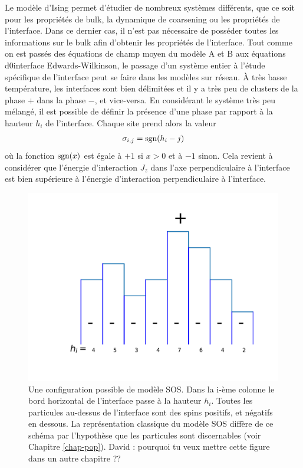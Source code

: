 Le modèle d'Ising permet d'étudier de nombreux systèmes différents, que ce soit pour les propriétés de bulk, la dynamique de coarsening ou les propriétés de l'interface. Dans ce dernier cas, il n'est pas nécessaire de posséder toutes les informations sur le bulk afin d'obtenir les propriétés de l'interface. 
Tout comme on est passés des équations de champ moyen du modèle A et B aux équations d0interface Edwards-Wilkinson, le passage d'un système entier à l'étude spécifique de l'interface peut se faire dans les modèles sur réseau.
À très basse température, les interfaces sont bien délimitées et il y a très peu de clusters de la phase $+$ dans la phase $-$, et vice-versa. En considérant le système très peu mélangé, il est possible de définir la présence d'une phase par rapport à la hauteur $h_i$ de l'interface. Chaque site prend alors la valeur
\begin{align*}
	\sigma_{i,j} = \operatorname{sgn}(h_i-j)
\end{align*}
où la fonction $\operatorname{sgn}(x)$ est égale à $+1$ si $x >0$ et à $-1$ sinon. Cela revient à considérer que l'énergie d'interaction $J_z$ dans l'axe perpendiculaire à l'interface est bien supérieure à l'énergie d'interaction perpendiculaire à l'interface.

\begin{figure}
	\centering
	\includegraphics[scale=1]{int-dyn/sos-indiscernable.pdf}
	\caption{Une configuration possible de modèle SOS. Dans la i-ème colonne le bord horizontal de l'interface passe à la hauteur $h_i$. Toutes les particules au-dessus de l'interface sont des spins positifs, et négatifs en dessous. La représentation classique du modèle SOS diffère de ce schéma par l'hypothèse que les particules sont discernables (voir Chapitre \ref{chap-pop}).
	{\color{red} David : pourquoi tu veux mettre cette figure dans un autre chapitre ??}}
    \label{figure-sos}
\end{figure}

